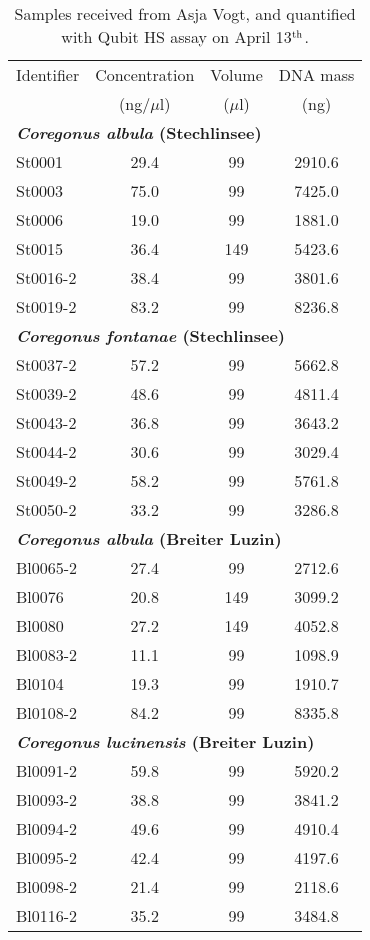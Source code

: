 \documentclass[a4paper,12pt,twosided]{article}
\begin{document}
\begin{table}
\begin{center}
\caption{Samples received from Asja Vogt, and quantified with Qubit HS assay on April 13$^{\rm{th}}$.}\label{tau:samples}
\vspace*{0.2cm}
\begin{tabular}{lccc}
\toprule
Identifier&Concentration&Volume&DNA mass\\
&\multicolumn{1}{c}{(ng/$\mu$l)}&\multicolumn{1}{c}{($\mu$l)}&\multicolumn{1}{c}{(ng)}\\
\midrule
\multicolumn{4}{l}{\bf \emph{Coregonus albula} (Stechlinsee)}\\
St0001&29.4&99&2910.6\\
St0003&75.0&99&7425.0\\
St0006&19.0&99&1881.0\\
St0015&36.4&149&5423.6\\
St0016-2&38.4&99&3801.6\\
St0019-2&83.2&99&8236.8\\
\multicolumn{4}{l}{\bf \emph{Coregonus fontanae} (Stechlinsee)}\\
St0037-2&57.2&99&5662.8\\
St0039-2&48.6&99&4811.4\\
St0043-2&36.8&99&3643.2\\
St0044-2&30.6&99&3029.4\\
St0049-2&58.2&99&5761.8\\
St0050-2&33.2&99&3286.8\\
\multicolumn{4}{l}{\bf \emph{Coregonus albula} (Breiter Luzin)}\\
Bl0065-2&27.4&99&2712.6\\
Bl0076&20.8&149&3099.2\\
Bl0080&27.2&149&4052.8\\
Bl0083-2&11.1&99&1098.9\\
Bl0104&19.3&99&1910.7\\
Bl0108-2&84.2&99&8335.8\\
\multicolumn{4}{l}{\bf \emph{Coregonus lucinensis} (Breiter Luzin)}\\
Bl0091-2&59.8&99&5920.2\\
Bl0093-2&38.8&99&3841.2\\
Bl0094-2&49.6&99&4910.4\\
Bl0095-2&42.4&99&4197.6\\
Bl0098-2&21.4&99&2118.6\\
Bl0116-2&35.2&99&3484.8\\
\bottomrule
\end{tabular}
\end{center}
\end{table}
\end{document}
